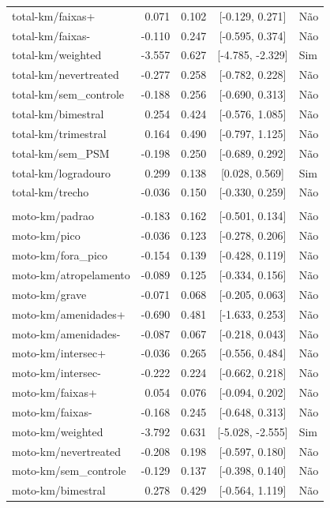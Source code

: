 \begin{longtable}{lrrcl}
total-km/faixas+ & 0.071 & 0.102 & {}[-0.129, 0.271] & Não\\
total-km/faixas- & -0.110 & 0.247 & {}[-0.595, 0.374] & Não\\
total-km/weighted & -3.557 & 0.627 & {}[-4.785, -2.329] & Sim\\
total-km/nevertreated & -0.277 & 0.258 & {}[-0.782, 0.228] & Não\\
total-km/sem\_controle & -0.188 & 0.256 & {}[-0.690, 0.313] & Não\\
total-km/bimestral & 0.254 & 0.424 & {}[-0.576, 1.085] & Não\\
total-km/trimestral & 0.164 & 0.490 & {}[-0.797, 1.125] & Não\\
total-km/sem\_PSM & -0.198 & 0.250 & {}[-0.689, 0.292] & Não\\
total-km/logradouro & 0.299 & 0.138 & {}[0.028, 0.569] & Sim\\
total-km/trecho & -0.036 & 0.150 & {}[-0.330, 0.259] & Não\\
 &  &  &  & \\
moto-km/padrao & -0.183 & 0.162 & {}[-0.501, 0.134] & Não\\
moto-km/pico & -0.036 & 0.123 & {}[-0.278, 0.206] & Não\\
moto-km/fora\_pico & -0.154 & 0.139 & {}[-0.428, 0.119] & Não\\
moto-km/atropelamento & -0.089 & 0.125 & {}[-0.334, 0.156] & Não\\
moto-km/grave & -0.071 & 0.068 & {}[-0.205, 0.063] & Não\\
moto-km/amenidades+ & -0.690 & 0.481 & {}[-1.633, 0.253] & Não\\
moto-km/amenidades- & -0.087 & 0.067 & {}[-0.218, 0.043] & Não\\
moto-km/intersec+ & -0.036 & 0.265 & {}[-0.556, 0.484] & Não\\
moto-km/intersec- & -0.222 & 0.224 & {}[-0.662, 0.218] & Não\\
moto-km/faixas+ & 0.054 & 0.076 & {}[-0.094, 0.202] & Não\\
moto-km/faixas- & -0.168 & 0.245 & {}[-0.648, 0.313] & Não\\
moto-km/weighted & -3.792 & 0.631 & {}[-5.028, -2.555] & Sim\\
moto-km/nevertreated & -0.208 & 0.198 & {}[-0.597, 0.180] & Não\\
moto-km/sem\_controle & -0.129 & 0.137 & {}[-0.398, 0.140] & Não\\
moto-km/bimestral & 0.278 & 0.429 & {}[-0.564, 1.119] & Não\\

\end{longtable}
